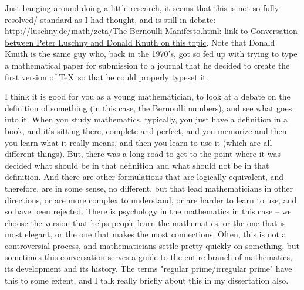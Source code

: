 \documentclass[12pt]{article}
\begin{document}
Just banging around doing a little research, it seems that this is not so fully resolved/ standard as I had thought, and is still in debate: \href{http://luschny.de/math/zeta/The-Bernoulli-Manifesto.html}{http://luschny.de/math/zeta/The-Bernoulli-Manifesto.html: link to Conversation between Peter Luschny and Donald Knuth on this topic}.  Note that Donald Knuth is the same guy who, back in the 1970's, got so fed up with trying to type a mathematical paper for submission to a journal that he decided to create the first version of \TeX\ so that he could properly typeset it.

I think it is good for you as a young mathematician, to look at a debate on the definition of something (in this case, the Bernoulli numbers), and see what goes into it.  When you study mathematics, typically, you just have a definition in a book, and it's sitting there, complete and perfect, and you memorize and then you learn what it really means, and then you learn to use it (which are all different things).  But, there was a long road to get to the point where it was decided what should be in that definition and what should not be in that definition.  And there are other formulations that are logically equivalent, and therefore, are in some sense, no different, but that lead mathematicians in other directions, or are more complex to understand, or are harder to learn to use, and so have been rejected.  There is psychology in the mathematics in this case -- we choose the version that helps people learn the mathematics, or the one that is most elegant, or the one that makes the most connections.  Often, this is not a controversial process, and mathematicians settle pretty quickly on something, but sometimes this conversation serves a guide to the entire branch of mathematics, its development and its history.  The terms "regular prime/irregular prime" have this to some extent, and I talk really briefly about this in my dissertation also.
\end{document}
